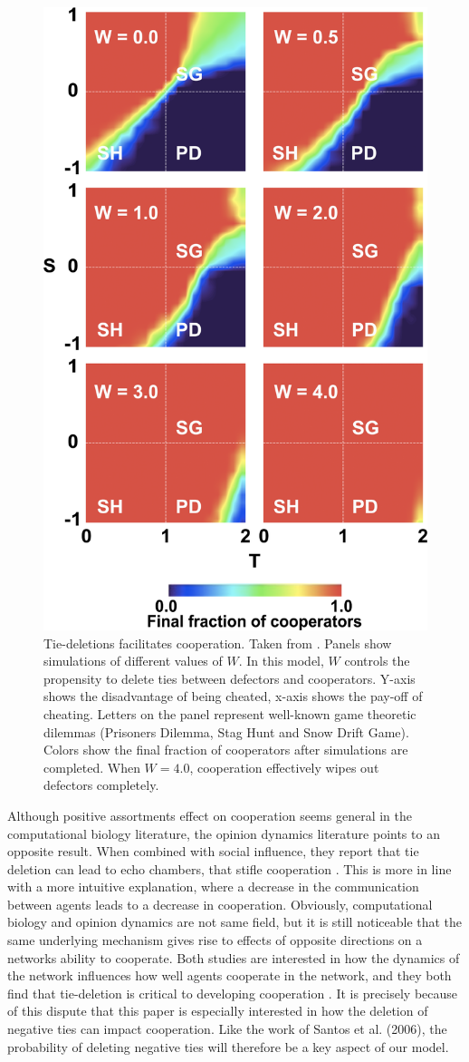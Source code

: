 \documentclass{article}
\begin{document}
\begin{figure}[H]
    \centering
    \includegraphics[width=.4\linewidth]{../plots/references/santos.png}
  \caption{Tie-deletions facilitates cooperation. Taken from \protect\citeauthor{santos_cooperation_2006} \protect\citeyear{santos_cooperation_2006}. Panels show simulations of different values of $W$. In this model, $W$ controls the propensity to delete ties between defectors and cooperators. Y-axis shows the disadvantage of being cheated, x-axis shows the pay-off of cheating. Letters on the panel represent well-known game theoretic dilemmas (Prisoners Dilemma, Stag Hunt and Snow Drift Game). Colors show the final fraction of cooperators after simulations are completed. When $W = 4.0$, cooperation effectively wipes out defectors completely. }
  \label{fig:santos}
\end{figure}

Although positive assortments effect on cooperation seems general in the computational biology literature, the opinion dynamics literature points to an opposite result. When combined with social influence, they report that tie deletion can lead to echo chambers, that stifle cooperation \cite{sasahara_social_2021}. This is more in line with a more intuitive explanation, where a decrease in the communication between agents leads to a decrease in cooperation. Obviously, computational biology and opinion dynamics are not same field, but it is still noticeable that the same underlying mechanism gives rise to effects of opposite directions on a networks ability to cooperate. Both studies are interested in how the dynamics of the network influences how well agents cooperate in the network, and they both find that tie-deletion is critical to developing cooperation \cite{santos_cooperation_2006,sasahara_social_2021}. It is precisely because of this dispute that this paper is especially interested in how the deletion of negative ties can impact cooperation. Like the work of Santos et al. (2006), the probability of deleting negative ties will therefore be a key aspect of our model.  
\end{document}
